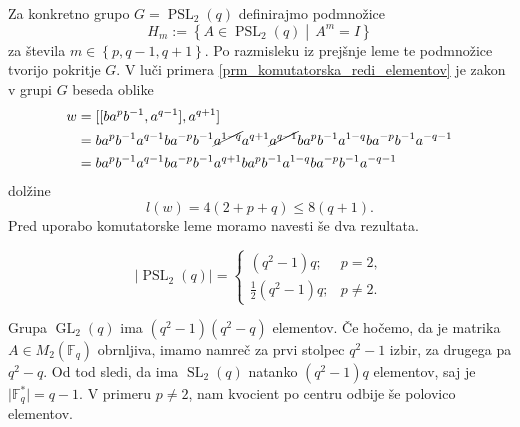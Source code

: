     Za konkretno grupo $G = \operatorname{PSL}_2(q)$ definirajmo podmnožice \begin{equation*}
        H_m := \left\{ A \in \operatorname{PSL}_2(q)  \middle|\,  A^{m} = I \right\}
    \end{equation*}  
       za števila $m \in \left\{ p, q-1 , q+1\right\}$.
    Po razmisleku iz prejšnje leme te podmnožice tvorijo pokritje $G$. V luči primera \ref{prm_komutatorska_redi_elementov} je zakon v grupi $G$ beseda oblike \begin{align*}
        w &= [[b a^{p} b^{-1}, a^{q-1}], a^{q + 1}]  \\
         &= b a^{p} b^{-1} a^{q-1} b a^{-p} b^{-1} \cancel{ a^{1 - q}} a^{q + 1} \cancel{a^{q -1}} b a^{p} b^{-1} a^{1 - q} b a^{-p} b^{-1} a^{- q - 1} \\ 
         &= b a^{p} b^{-1} a^{q-1} b a^{-p} b^{-1}  a^{q + 1}  b a^{p} b^{-1} a^{1 - q} b a^{-p} b^{-1} a^{- q - 1} 
    \end{align*}  
    dolžine \begin{equation*} 
    l(w) = 4(2 + p + q) \le 8(q + 1). 
    \end{equation*}
    Pred uporabo komutatorske leme moramo navesti še dva rezultata.
    \begin{lema}
    \label{lem_velikost_grupe_psl2q}
    \begin{equation*}
        \lvert \operatorname{PSL}_2(q) \rvert   = \begin{cases}
            (q^2 - 1) q; & p = 2,  \\
            \frac{1}{2} (q^2 - 1) q ; & p \neq 2.
        \end{cases}
     \end{equation*} 
    \end{lema}
    \begin{dokaz}
    Grupa $\operatorname{GL}_2(q)$ ima $(q^2  -1)(q^2 - q)$ elementov. Če hočemo, da je matrika $A \in M_2(\mathbb{F}_q)$ obrnljiva, imamo namreč za prvi stolpec $q^2 -1$ izbir, za drugega pa $q^2 - q$.
    Od tod sledi, da ima $\operatorname{SL}_2(q)$ natanko $(q^2  -1)q$ elementov, saj je $\lvert \mathbb{F}_q^{*} \rvert = q-1$. V primeru $p \neq 2$, nam kvocient po centru odbije še polovico elementov.   
    \end{dokaz}
    
